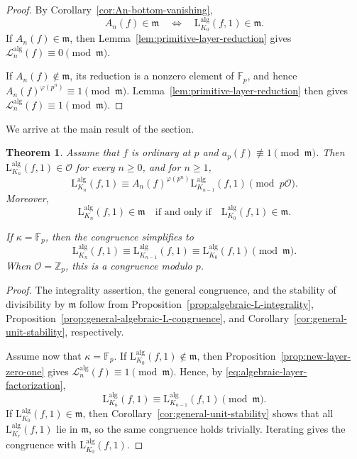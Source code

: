 \documentclass[11pt,table]{amsart}
\newtheorem{theorem}{Theorem}[section]
\newcommand{\Z}{\mathbb{Z}}
\newcommand{\F}{\mathbb{F}}
\numberwithin{equation}{section}
\begin{document}
\begin{proof}
By Corollary~\ref{cor:An-bottom-vanishing},
\[
        A_n(f)\in\mathfrak m
        \quad\Longleftrightarrow\quad
        \mathrm{L}_{K_0}^{\operatorname{alg}}(f,1)\in\mathfrak m.
\]
If \(A_n(f)\in\mathfrak m\), then
Lemma~\ref{lem:primitive-layer-reduction} gives
\(\mathscr L_n^{\operatorname{alg}}(f)\equiv0\pmod{\mathfrak m}\).

If \(A_n(f)\notin\mathfrak m\), its reduction is a nonzero element of
\(\F_p\), and hence
\(A_n(f)^{\varphi(p^n)}\equiv1\pmod{\mathfrak m}\).
Lemma~\ref{lem:primitive-layer-reduction} then gives
\(\mathscr L_n^{\operatorname{alg}}(f)\equiv1\pmod{\mathfrak m}\).
\end{proof}

\par We arrive at the main result of the section.

\begin{theorem}
\label{lthm:intro-modular}
Assume that \(f\) is ordinary at \(p\) and
\(a_p(f)\not\equiv1\pmod{\mathfrak m}\). Then
\(\mathrm{L}_{K_n}^{\operatorname{alg}}(f,1)\in\mathcal O\) for every
\(n\geq0\), and for \(n\geq1\),
\[
        \mathrm{L}_{K_n}^{\operatorname{alg}}(f,1)
        \equiv
        A_n(f)^{\varphi(p^n)}
        \mathrm{L}_{K_{n-1}}^{\operatorname{alg}}(f,1)
        \pmod{p\mathcal O}.
\]
Moreover,
\[
        \mathrm{L}_{K_n}^{\operatorname{alg}}(f,1)\in\mathfrak m
        \quad\text{if and only if}\quad
        \mathrm{L}_{K_0}^{\operatorname{alg}}(f,1)\in\mathfrak m.
\]

If \(\kappa=\F_p\), then the congruence simplifies to
\[
        \mathrm{L}_{K_n}^{\operatorname{alg}}(f,1)
        \equiv
        \mathrm{L}_{K_{n-1}}^{\operatorname{alg}}(f,1)
        \equiv
        \mathrm{L}_{K_0}^{\operatorname{alg}}(f,1)
        \pmod{\mathfrak m}.
\]
When \(\mathcal O=\Z_p\), this is a congruence modulo \(p\).
\end{theorem}

\begin{proof}
The integrality assertion, the general congruence, and the stability of
divisibility by \(\mathfrak m\) follow from
Proposition~\ref{prop:algebraic-L-integrality},
Proposition~\ref{prop:general-algebraic-L-congruence}, and
Corollary~\ref{cor:general-unit-stability}, respectively.

Assume now that \(\kappa=\F_p\). If
\(\mathrm{L}_{K_0}^{\operatorname{alg}}(f,1)\notin\mathfrak m\), then
Proposition~\ref{prop:new-layer-zero-one} gives
\(\mathscr L_n^{\operatorname{alg}}(f)\equiv1\pmod{\mathfrak m}\).
Hence, by \eqref{eq:algebraic-layer-factorization},
\[
        \mathrm{L}_{K_n}^{\operatorname{alg}}(f,1)
        \equiv
        \mathrm{L}_{K_{n-1}}^{\operatorname{alg}}(f,1)
        \pmod{\mathfrak m}.
\]
If \(\mathrm{L}_{K_0}^{\operatorname{alg}}(f,1)\in\mathfrak m\), then
Corollary~\ref{cor:general-unit-stability} shows that all
\(\mathrm{L}_{K_r}^{\operatorname{alg}}(f,1)\) lie in
\(\mathfrak m\), so the same congruence holds trivially. Iterating
gives the congruence with
\(\mathrm{L}_{K_0}^{\operatorname{alg}}(f,1)\).
\end{proof}




\end{document}
